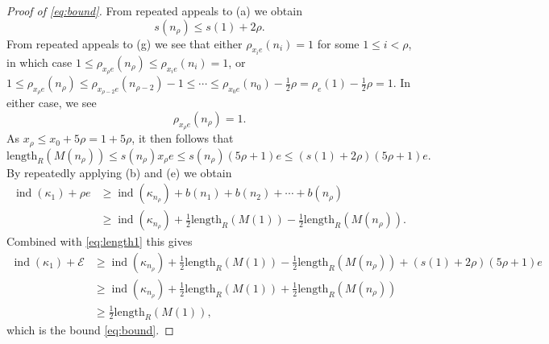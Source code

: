 \documentclass[a4paper,10pt]{amsart}
\numberwithin{equation}{section}
\numberwithin{equation}{section}
\theoremstyle{plain}
\theoremstyle{definition}
\theoremstyle{definition}
\theoremstyle{plain}
\theoremstyle{plain}
\theoremstyle{plain}
\theoremstyle{plain}
\newcommand{\ind}{\operatorname{ind}}
\newcommand{\CE}{\mathcal{E}}
\newcommand{\kap}{\kappa}
\begin{document}
\begin{proof}[Proof of \eqref{eq:bound}]
From repeated appeals to (a) we obtain 
$$
s(n_\rho) \leq s(1) + 2\rho. 
$$
From repeated appeals to (g) we see that 
either $\rho_{x_ie}(n_i) = 1$ for some $1\leq i<\rho$, in which case $1\leq \rho_{x_\rho e}(n_\rho) \leq \rho_{x_ie} (n_i) = 1$, 
or $1\leq \rho_{x_\rho e} (n_\rho) \leq \rho_{x_{\rho-2} e} (n_{\rho-2})-1 \leq \cdots \leq \rho_{x_0 e}(n_0) - \tfrac{1}{2}\rho = \rho_e(1) - \tfrac{1}{2}\rho = 1$.
In either case, we see
$$
\rho_{x_\rho e}(n_\rho) = 1.
$$
As $x_\rho \leq x_0 + 5\rho = 1 +5\rho$, it then follows that 
\begin{equation}\label{eq:length1}
\mathrm{length}_R(M(n_\rho)) \leq s(n_\rho)x_\rho e  \leq s(n_\rho)(5\rho+1) e \leq (s(1) + 2\rho)(5\rho+1) e.
\end{equation}
By repeatedly applying (b) and (e) we obtain
\begin{equation*}\begin{split}
\ind(\kap_1) + \rho e &  \geq \ind(\kap_{n_\rho}) + b(n_1) + b(n_2) + \cdots + b(n_\rho)  \\
&\geq \ind(\kap_{n_\rho}) + \tfrac{1}{2}\mathrm{length}_R(M(1)) - \tfrac{1}{2}\mathrm{length}_R(M(n_\rho)).
\end{split}
\end{equation*}
Combined with \eqref{eq:length1} this gives
\begin{equation*}\begin{split} 
\ind(\kap_1) + \CE & \geq \ind(\kap_{n_\rho}) + \tfrac{1}{2}\mathrm{length}_R(M(1)) - \tfrac{1}{2}\mathrm{length}_R(M(n_\rho)) + (s(1)+2\rho)(5\rho+1)e \\
& \geq \ind(\kap_{n_\rho}) + \tfrac{1}{2}\mathrm{length}_R(M(1)) + \tfrac{1}{2}\mathrm{length}_R(M(n_\rho))  \\
& \geq \tfrac{1}{2}\mathrm{length}_R(M(1)),
\end{split}
\end{equation*}
which is the bound \eqref{eq:bound}.




\end{proof}
\end{document}
